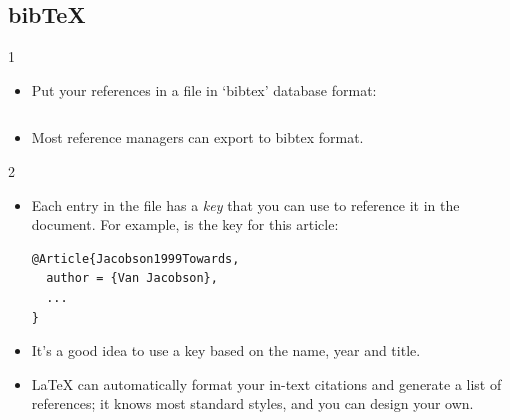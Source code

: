 \documentclass[10pt,times]{beamer}
\begin{document}
\subsection{bib\TeX}
\begin{frame}[fragile]{\insertsubsection{} 1}
\begin{itemize}
\item Put your references in a  file in `bibtex' database format:
\inputminted[fontsize=\scriptsize,frame=single]{latex}{bib-example.bib}
\item Most reference managers can export to bibtex format.
\end{itemize}
\end{frame}


\begin{frame}[fragile]{\insertsubsection{} 2}
\begin{itemize}
\item Each entry in the  file has a \emph{key} that you can use to
reference it in the document. For example,  is the 
key for this article:
\begin{verbatim}
@Article{Jacobson1999Towards,
  author = {Van Jacobson},
  ...
}
\end{verbatim}
\item It's a good idea to use a key based on the name, year and title.
\item \LaTeX{} can automatically format your in-text citations and generate a
list of references; it knows most standard styles, and you can design your own.
\end{itemize}
\end{frame}
\end{document}
